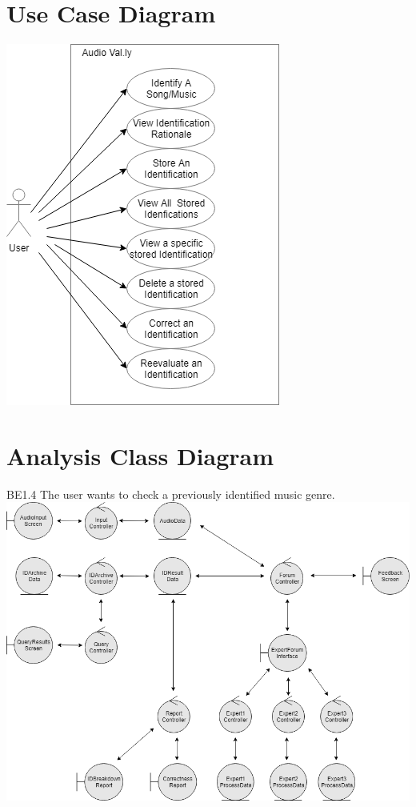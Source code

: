 \documentclass[]{article}
\begin{document}
\section{Use Case Diagram}
\label{sec:use_case_diagram}
\begin{center}
\includegraphics[scale=0.5]{uc}
\end{center}

\newpage
\section{Analysis Class Diagram}
\label{sec:analysis_class_diagram}
\begin{center}
BE1.4 The user wants to check a previously identified music genre.
\includegraphics[scale=0.5]{analysisclass}
\end{center}
\end{document}
